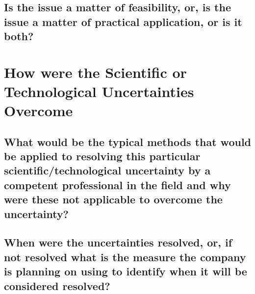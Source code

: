 \documentclass[11pt,a4paper]{article}
\begin{document}
\subsection{Is the issue a matter of feasibility, or, is the issue a matter of practical application, or is it both?}

\section{How were the Scientific or Technological Uncertainties Overcome}
\subsection{What would be the typical methods that would be applied to resolving this particular scientific/technological uncertainty by a competent professional in the field and why were these not applicable to overcome the uncertainty?}

\subsection{When were the uncertainties resolved, or, if not resolved what is the measure the company is planning on using to identify when it will be considered resolved?}
\end{document}
